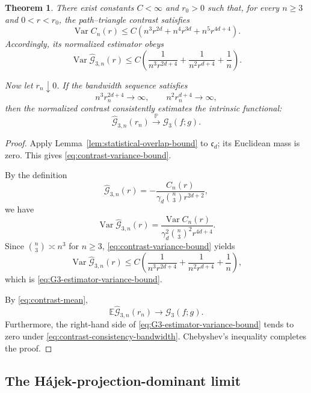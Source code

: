 \documentclass[11pt]{article}
\newtheorem{theorem}{Theorem}[section]
\theoremstyle{remark}
\newcommand{\E}{\mathbb E}
\newcommand{\Pp}{\mathbb P}
\numberwithin{equation}{section}
\begin{document}
\begin{theorem}
\label{thm:contrast-consistency-revise}
There exist constants $C<\infty$ and $r_0>0$ such that, for every
$n\ge3$ and $0<r<r_0$, the path--triangle contrast satisfies
\begin{equation}
\operatorname{Var} C_n(r)
\le
C\left(
n^3r^{2d}
+n^4r^{3d}
+n^5r^{4d+4}
\right).
\end{equation}
Accordingly, its normalized estimator obeys
\begin{equation}
\operatorname{Var}\widehat{\mathcal G}_{3,n}(r)
\le
C\left(
\frac1{n^3r^{2d+4}}
+
\frac1{n^2r^{d+4}}
+
\frac1n
\right).
\end{equation}

Now let $r_n\downarrow0$.  If the bandwidth sequence satisfies
\begin{equation}
n^3r_n^{2d+4}\longrightarrow\infty,
\qquad
n^2r_n^{d+4}\longrightarrow\infty,
\end{equation}
then the normalized contrast consistently estimates the intrinsic functional:
\[
\widehat{\mathcal G}_{3,n}(r_n)
\xrightarrow{\Pp}
\mathcal G_3(f;g).
\]
\end{theorem}

\begin{proof}
Apply Lemma~\ref{lem:statistical-overlap-bound} to $\mathfrak c_d$; its
Euclidean mass is zero.  This gives
\eqref{eq:contrast-variance-bound}.

By the definition
\[
\widehat{\mathcal G}_{3,n}(r)
=
-\frac{C_n(r)}
{\gamma_d\binom n3 r^{2d+2}},
\]
we have
\[
\operatorname{Var}\widehat{\mathcal G}_{3,n}(r)
=
\frac{\operatorname{Var}C_n(r)}
{\gamma_d^2\binom n3^2r^{4d+4}}.
\]
Since $\binom n3\asymp n^3$ for $n\ge3$,
\eqref{eq:contrast-variance-bound} yields
\[
\operatorname{Var}\widehat{\mathcal G}_{3,n}(r)
\le
C\left(
\frac1{n^3r^{2d+4}}
+
\frac1{n^2r^{d+4}}
+
\frac1n
\right),
\]
which is \eqref{eq:G3-estimator-variance-bound}.

By \eqref{eq:contrast-mean},
\[
\E\widehat{\mathcal G}_{3,n}(r_n)
\longrightarrow\mathcal G_3(f;g).
\]
Furthermore, the right-hand side of
\eqref{eq:G3-estimator-variance-bound} tends to zero under
\eqref{eq:contrast-consistency-bandwidth}.  Chebyshev's inequality completes
the proof.
\end{proof}

\subsection{The H\'ajek-projection-dominant limit}
\end{document}
